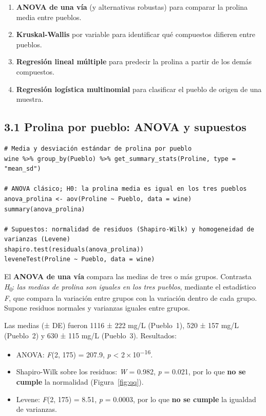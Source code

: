 \documentclass[10pt,letterpaper,twocolumn]{article}
\newcommand{\Hcero}{\textit{H}\textsubscript{0}}
\newcommand{\pval}{\textit{p}}
\newcommand{\sci}[2]{#1\,×\,10\textsuperscript{−#2}}
\begin{document}
\begin{enumerate}
  \item[3.1] \textbf{ANOVA de una vía} (y alternativas robustas) para comparar la prolina media entre pueblos.
  \item[3.2] \textbf{Kruskal-Wallis} por variable para identificar qué compuestos difieren entre pueblos.
  \item[3.3] \textbf{Regresión lineal múltiple} para predecir la prolina a partir de los demás compuestos.
  \item[3.4] \textbf{Regresión logística multinomial} para clasificar el pueblo de origen de una muestra.
\end{enumerate}

\subsection{3.1 Prolina por pueblo: ANOVA y supuestos}

\begin{lstlisting}[firstnumber=490]
# Media y desviación estándar de prolina por pueblo
wine %>% group_by(Pueblo) %>% get_summary_stats(Proline, type = "mean_sd")

# ANOVA clásico; H0: la prolina media es igual en los tres pueblos
anova_prolina <- aov(Proline ~ Pueblo, data = wine)
summary(anova_prolina)

# Supuestos: normalidad de residuos (Shapiro-Wilk) y homogeneidad de varianzas (Levene)
shapiro.test(residuals(anova_prolina))
leveneTest(Proline ~ Pueblo, data = wine)
\end{lstlisting}

El \textbf{ANOVA de una vía} compara las medias de tres o más grupos. Contrasta \Hcero: \textit{las medias de prolina son iguales en los tres pueblos}, mediante el estadístico \textit{F}, que compara la variación entre grupos con la variación dentro de cada grupo. Supone residuos normales y varianzas iguales entre grupos.

Las medias (± DE) fueron 1116 ± 222 mg/L (Pueblo~1), 520 ± 157 mg/L (Pueblo~2) y 630 ± 115 mg/L (Pueblo~3). Resultados:
\begin{itemize}
  \item ANOVA: \textit{F}(2, 175) = 207.9, \pval{} < \sci{2}{16}.
  \item Shapiro-Wilk sobre los residuos: \textit{W} = 0.982, \pval{} = 0.021, por lo que \textbf{no se cumple} la normalidad (Figura~\ref{fig:qq}).
  \item Levene: \textit{F}(2, 175) = 8.51, \pval{} = 0.0003, por lo que \textbf{no se cumple} la igualdad de varianzas.
\end{itemize}
\end{document}
